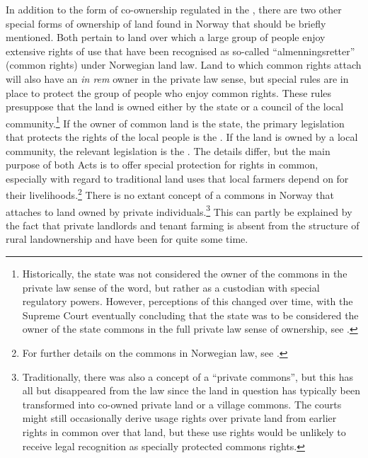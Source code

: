 In addition to the form of co-ownership regulated in the \cite{coa65}, there are two other special forms of ownership of land found in Norway that should be briefly mentioned. Both pertain to land over which a large group of people enjoy extensive rights of use that have been recognised as so-called ``almenningsretter'' (common rights) under Norwegian land law. Land to which common rights attach will also have an {\it in rem} owner in the private law sense, but special rules are in place to protect the group of people who enjoy common rights. These rules presuppose that the land is owned either by the state or a council of the local community.\footnote{Historically, the state was not considered the owner of the commons in the private law sense of the word, but rather as a custodian with special regulatory powers. However, perceptions of this changed over time, with the Supreme Court eventually concluding that the state was to be considered the owner of the state commons in the full private law sense of ownership, see \cite{vinstra63}.} If the owner of common land is the state, the primary legislation that protects the rights of the local people is the \cite{ma75}. If the land is owned by a local community, the relevant legislation is the \cite{vca92}. The details differ, but the main purpose of both Acts is to offer special protection for rights in common, especially with regard to traditional land uses that local farmers depend on for their livelihoods.\footnote{For further details on the commons in Norwegian law, see \cite{stenseth05}.} There is no extant concept of a commons in Norway that attaches to land owned by private individuals.\footnote{Traditionally, there was also a concept of a ``private commons'', but this has all but disappeared from the law since the land in question has typically been transformed into co-owned private land or a village commons. The courts might still occasionally derive usage rights over private land from earlier rights in common over that land, but these use rights would be unlikely to receive legal recognition as specially protected commons rights.} This can partly be explained by the fact that private landlords and tenant farming is absent from the structure of rural landownership and have been for quite some time.

